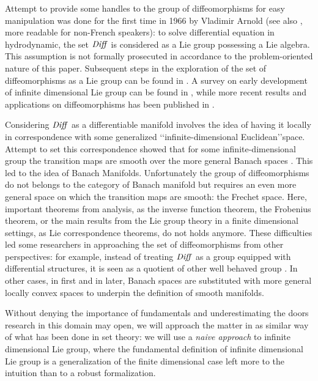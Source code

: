 Attempt to provide some handles to the group of diffeomorphisms for easy manipulation was done for the first time in 1966 by Vladimir Arnold \cite{arnold1966geometrie} (see also \cite{arnold1998topological}, more readable for non-French speakers): to solve differential equation in hydrodynamic, the set $\text{\emph{Diff}}$ is considered as a Lie group possessing a Lie algebra. This assumption is not formally prosecuted in accordance to the problem-oriented nature of this paper. Subsequent steps in the exploration of the set of diffeomorphisms as a Lie group can be found in \cite{marsden1970hamiltonian, ebin1970groups, omori1970group, leslie1983lie}. A survey on early development of infinite dimensional Lie group can be found in \cite{Milnor:84:remarks}, while more recent results and applications on diffeomorphisms has been published in \cite{ovsienko1992integrals, bauer2010sobolev,schmid2010infinite,  bauer2011geodesic}.

Considering $\text{\emph{Diff}}$ as a differentiable manifold involves the idea of having it locally in correspondence with some generalized \lq\lq infinite-dimensional Euclidean\rq\rq\phantom{z}space. Attempt to set this correspondence showed that for some infinite-dimensional group the transition maps are smooth over the more general Banach spaces \cite{khesin2008geometry}. This led to the idea of Banach Manifolds. Unfortunately the group of diffeomorphisms do not belongs to the category of Banach manifold but requires an even more general space on which the transition maps are smooth: the Frechet space. Here, important theorems from analysis, as the inverse function theorem, the Frobenius theorem, or the main results from the Lie group theory in a finite dimensional settings, as Lie correspondence theorems, do not holds anymore. These difficulties led some researchers in approaching the set of diffeomorphisms from other perspectives: 
for example, instead of treating $\text{\emph{Diff}}$ as a group equipped with differential structures, it is seen as a quotient of other well behaved group \cite{wojtynski1994one}. In other cases, in \cite{marsden1970hamiltonian} first and in \cite{milnor1984remarks} later, Banach spaces are substituted with more general locally convex spaces to underpin the definition of smooth manifolds. 

Without denying the importance of fundamentals and underestimating the doors research in this domain may open, we will approach the matter in as similar way of what has been done in set theory: we will use a \emph{naive approach} to infinite dimensional Lie group, where the fundamental definition of infinite dimensional Lie group is a generalization of the finite dimensional case left more to the intuition than to a robust formalization. 

